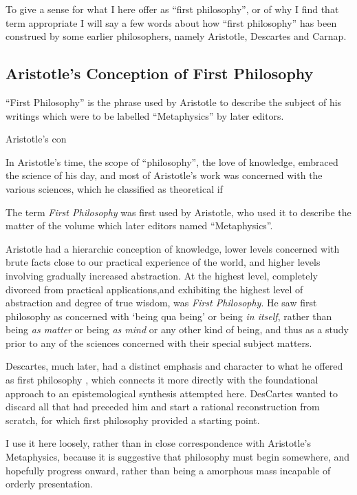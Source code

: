 \documentclass[10pt,titlepage]{book}
\begin{document}
To give a sense for what I here offer as ``first philosophy'', or of why I find that term appropriate I will say a few words about how ``first philosophy'' has been construed by some earlier philosophers, namely Aristotle, Descartes and Carnap.

\subsection{Aristotle's Conception of First Philosophy}

``First Philosophy'' is the phrase used by Aristotle to describe the subject of his writings which were to be labelled ``Metaphysics'' by later editors.

Aristotle's con

In Aristotle's time, the scope of ``philosophy'', the love of knowledge, embraced the science of his day, and most of Aristotle's work was concerned with the various sciences, which he classified as theoretical if

The term \emph{First Philosophy} was first used by Aristotle, who used it to describe the matter of the volume which later editors named ``Metaphysics''\cite{aristotleMetap}.

Aristotle had a hierarchic conception of knowledge, lower levels concerned with brute facts close to our practical experience of the world, and higher levels involving gradually increased abstraction.
At the highest level, completely divorced from practical applications,and  exhibiting the highest level of abstraction and degree of true wisdom, was \emph{First Philosophy}.
He saw first philosophy as concerned with `being qua being' or being \emph{in  itself}, rather than being \emph{as matter} or being \emph{as mind} or any other kind of being, and thus as a study prior to any of the sciences concerned with their special subject matters.

Descartes, much later, had a distinct emphasis and character to what he offered as first philosophy \cite{descartes2013meditations}, which connects it more directly with the foundational approach to an epistemological synthesis attempted here.
DesCartes wanted to discard all that had preceded him and start a rational reconstruction from scratch, for which first philosophy provided a starting point.

I use it here loosely, rather than in close correspondence with Aristotle's Metaphysics, because it is suggestive that philosophy must begin somewhere, and hopefully progress onward, rather than being a amorphous mass incapable of orderly presentation.
\end{document}
